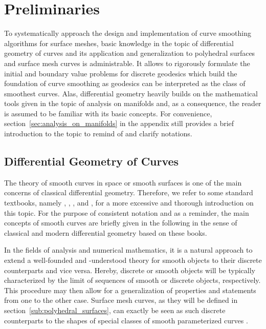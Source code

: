 \documentclass{stdlocal}
\begin{document}
\section{Preliminaries} %
\label{sec:preliminaries}

To systematically approach the design and implementation of curve smoothing algorithms for surface meshes, basic knowledge in the topic of differential geometry of curves and its application and generalization to polyhedral surfaces and surface mesh curves is administrable.
It allows to rigorously formulate the initial and boundary value problems for discrete geodesics which build the foundation of curve smoothing as geodesics can be interpreted as the class of smoothest curves.
Alas, differential geometry heavily builds on the mathematical tools given in the topic of analysis on manifolds and, as a consequence, the reader is assumed to be familiar with its basic concepts.
For convenience, section~\ref{sec:analysis_on_manifolds} in the appendix still provides a brief introduction to the topic to remind of and clarify notations.

\subsection{Differential Geometry of Curves} %
\label{sub:differential_geometry}

  The theory of smooth curves in space or smooth surfaces is one of the main concerns of classical differential geometry.
  Therefore, we refer to some standard textbooks, namely \textcite{goldhorn2009}, \textcite{carmo2016}, \textcite{kuehnel2013}, and \textcite{stahl2013}, for a more excessive and thorough introduction on this topic.
  For the purpose of consistent notation and as a reminder, the main concepts of smooth curves are briefly given in the following in the sense of classical and modern differential geometry based on these books.

  In the fields of analysis and numerical mathematics, it is a natural approach to extend a well-founded and -understood theory for smooth objects to their discrete counterparts and vice versa.
  Hereby, discrete or smooth objects will be typically characterized by the limit of sequences of smooth or discrete objects, respectively.
  This procedure may then allow for a generalization of properties and statements from one to the other case.
  Surface mesh curves, as they will be defined in section~\ref{sub:polyhedral_surfaces}, can exactly be seen as such discrete counterparts to the shapes of special classes of smooth parameterized curves \autocite{polthier2006}. \\
  \autocite{forster2016,elstrodt2011,cheney2008,goldhorn2009}
\end{document}
